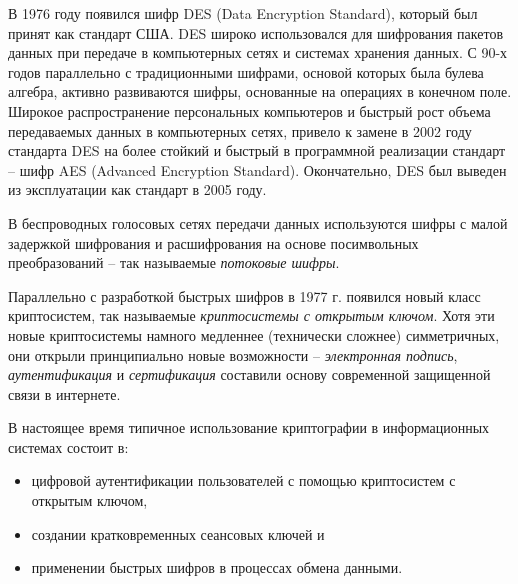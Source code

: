 В 1976 году появился шифр DES (Data Encryption Standard), который был принят как стандарт США. DES широко использовался для шифрования пакетов данных при передаче в компьютерных сетях и системах хранения данных. С 90-х годов параллельно с традиционными шифрами, основой которых была булева алгебра,  активно развиваются шифры, основанные на операциях в конечном поле.  Широкое распространение персональных компьютеров и быстрый рост объема передаваемых данных в компьютерных сетях,  привело к замене в 2002 году стандарта DES  на более стойкий и быстрый в программной реализации стандарт -- шифр AES (Advanced Encryption Standard). Окончательно, DES был выведен из эксплуатации как стандарт в 2005 году.

В беспроводных голосовых сетях передачи данных используются шифры с малой задержкой шифрования и расшифрования на основе посимвольных преобразований -- так называемые \emph{потоковые шифры}.


Параллельно с разработкой быстрых шифров в 1977 г. появился новый класс криптосистем, так называемые \emph{криптосистемы с открытым ключом}. Хотя эти новые криптосистемы намного медленнее (технически сложнее) симметричных, они открыли принципиально новые возможности --  \emph{электронная подпись}, \emph{аутентификация} и \emph{сертификация} составили основу современной защищенной связи в интернете.

В настоящее время типичное использование криптографии в информационных системах состоит в:
\begin{itemize}
\item цифровой аутентификации пользователей с помощью криптосистем с открытым ключом,
\item создании кратковременных сеансовых ключей и
\item применении быстрых шифров в процессах обмена данными.
\end{itemize}
